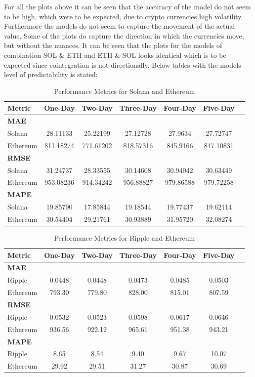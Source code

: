 \noindent For all the plots above it can be seen that the accuracy of the model do not seem to be high, which were to be expected, due to crypto currencies high volatility. Furthermore the models do not seem to capture the movement of the actual value. Some of the plots do capture the direction in which the currencies move, but without the nuances. It can be seen that the plots for the models of combination SOL \& ETH and ETH \& SOL looks identical which is to be expected since cointegration is not directionally. Below tables with the models level of predictability is stated:

\begin{table}[H]
\centering
\caption{Performance Metrics for Solana and Ethereum}
\begin{tabular}{lcccccc}
\toprule
\textbf{Metric} & \textbf{One-Day} & \textbf{Two-Day} & \textbf{Three-Day} & \textbf{Four-Day} & \textbf{Five-Day} \\
\midrule
\textbf{MAE} & & & & & \\
Solana        & 28.11133 & 25.22199 & 27.12728 & 27.9634 & 27.72747 \\
Ethereum      & 811.18274 & 771.61202 & 818.57316 & 845.9166 & 847.10831 \\
\midrule
\textbf{RMSE} & & & & & \\
Solana        & 31.24737 & 28.33555 & 30.14608 & 30.94042 & 30.63449 \\
Ethereum      & 953.08236 & 914.34242 & 956.88827 & 979.86588 & 979.72258 \\
\midrule
\textbf{MAPE} & & & & & \\
Solana        & 19.85790 & 17.85844 & 19.18544 & 19.77437 & 19.62114 \\
Ethereum      & 30.54404 & 29.21761 & 30.93889 & 31.95720 & 32.08274 \\
\bottomrule
\end{tabular}
\end{table}

\begin{table}[H]
\centering
\caption{Performance Metrics for Ripple and Ethereum}
\begin{tabular}{lcccccc}
\toprule
\textbf{Metric} & \textbf{One-Day} & \textbf{Two-Day} & \textbf{Three-Day} & \textbf{Four-Day} & \textbf{Five-Day} \\
\midrule
\textbf{MAE} & & & & & \\
Ripple        & 0.0448 & 0.0448 & 0.0473 & 0.0485 & 0.0503 \\
Ethereum      & 793.30 & 779.80 & 828.00 & 815.01 & 807.59 \\
\midrule
\textbf{RMSE} & & & & & \\
Ripple        & 0.0532 & 0.0523 & 0.0598 & 0.0617 & 0.0646 \\
Ethereum      & 936.56 & 922.12 & 965.61 & 951.38 & 943.21 \\
\midrule
\textbf{MAPE} & & & & & \\
Ripple        & 8.65 & 8.54 & 9.40 & 9.67 & 10.07 \\
Ethereum      & 29.92 & 29.51 & 31.27 & 30.87 & 30.69 \\
\bottomrule
\end{tabular}
\end{table}

